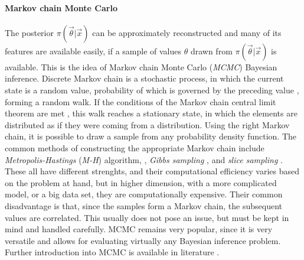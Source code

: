 \paragraph{Markov chain Monte Carlo}
The posterior $\pi(\vec{\theta}|\vec{x})$ can be approximately reconstructed and many of its features are available easily, if a sample of values $\theta$ drawn from $\pi(\vec{\theta}|\vec{x})$ is available. This is the idea of Markov chain Monte Carlo (\textit{MCMC}) Bayesian inference. Discrete Markov chain is a stochastic process, in which the current state is a random value, probability of which is governed by the preceding value \citep{markov1906extension}, forming a random walk. If the conditions of the Markov chain central limit theorem are met \citep{jones2004markov}, this walk reaches a stationary state, in which the elements are distributed as if they were coming from a distribution. Using the right Markov chain, it is possible to draw a sample from any probability density function. The common methods of constructing the appropriate Markov chain include \textit{Metropolis-Hastings} (\textit{M-H}) algorithm, \citep{metropolis1953equation,hastings1970monte}, \textit{Gibbs sampling} \citep{geman1984stochastic}, and \textit{slice sampling} \citep{damlen1999gibbs}. These all have different strenghts, and their computational efficiency varies based on the problem at hand, but in higher dimension, with a more complicated model, or a big data set, they are computationally expensive. Their common disadvantage is that, since the samples form a Markov chain, the subsequent values are correlated. This usually does not pose an issue, but must be kept in mind and handled carefully. MCMC remains very popular, since it is very versatile and allows for evaluating virtually any Bayesian inference problem. Further introduction into MCMC is available in literature \citep{brooks2011handbook}. 

